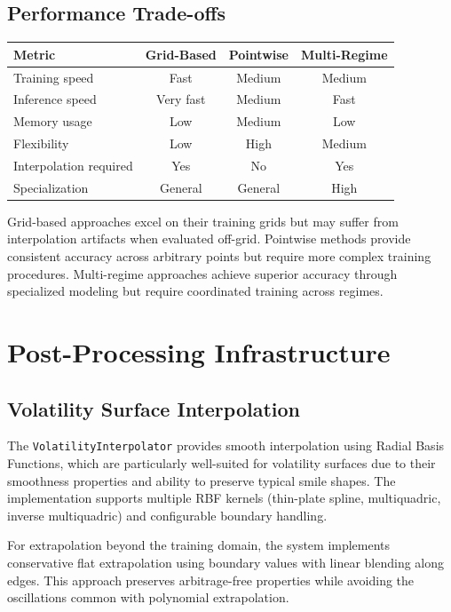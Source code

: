 	\subsection{Performance Trade-offs}\label{sec:tradeoffs}
	
	\begin{center}
		\begin{tabular}{@{}lccc@{}}
			\toprule
			\textbf{Metric} & \textbf{Grid-Based} & \textbf{Pointwise} & \textbf{Multi-Regime} \\
			\midrule
			Training speed & Fast & Medium & Medium \\
			Inference speed & Very fast & Medium & Fast \\
			Memory usage & Low & Medium & Low \\
			Flexibility & Low & High & Medium \\
			Interpolation required & Yes & No & Yes \\
			Specialization & General & General & High \\
			\bottomrule
		\end{tabular}
	\end{center}
	
	Grid-based approaches excel on their training grids but may suffer from interpolation artifacts when evaluated off-grid. Pointwise methods provide consistent accuracy across arbitrary points but require more complex training procedures. Multi-regime approaches achieve superior accuracy through specialized modeling but require coordinated training across regimes.
	
	\section{Post-Processing Infrastructure}
	
	\subsection{Volatility Surface Interpolation}\label{subsec:interp}
	
	The \texttt{VolatilityInterpolator} provides smooth interpolation using Radial Basis Functions, which are particularly well-suited for volatility surfaces due to their smoothness properties and ability to preserve typical smile shapes. The implementation supports multiple RBF kernels (thin-plate spline, multiquadric, inverse multiquadric) and configurable boundary handling.
	
	For extrapolation beyond the training domain, the system implements conservative flat extrapolation using boundary values with linear blending along edges. This approach preserves arbitrage-free properties while avoiding the oscillations common with polynomial extrapolation.
	
